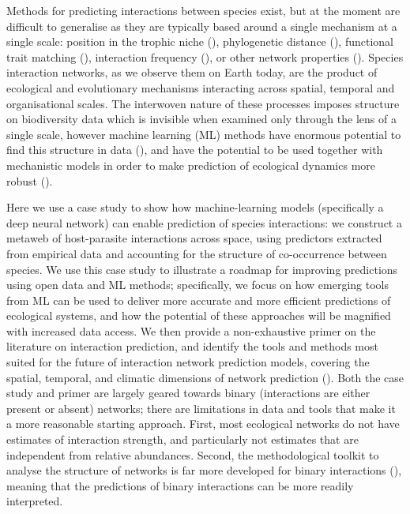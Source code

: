 \begin{refsection}
Methods for predicting interactions between species exist, but at the
moment are difficult to generalise as they are typically based around a
single mechanism at a single scale: position in the trophic niche
(\cite{Gravel2013InfFoo, Petchey2008SizFor}), phylogenetic distance
(\cite{Pomeranz2018InfPre, Elmasri2020HieBay}), functional trait matching
(\cite{Bartomeus2016ComFra}), interaction frequency
(\cite{Weinstein2017ComTra, Vazquez2005IntFre}), or other network
properties (\cite{Terry2020FinMis, Stock2017LinFil}). Species interaction
networks, as we observe them on Earth today, are the product of
ecological and evolutionary mechanisms interacting across spatial,
temporal and organisational scales. The interwoven nature of these
processes imposes structure on biodiversity data which is invisible when
examined only through the lens of a single scale, however machine
learning (ML) methods have enormous potential to find this structure in
data (\cite{Desjardins-Proulx2019ArtInt}), and have the potential to be
used together with mechanistic models in order to make prediction of
ecological dynamics more robust (\cite{Rackauckas2020UniDif}).

Here we use a case study to show how machine-learning models
(specifically a deep neural network) can enable prediction of species
interactions: we construct a metaweb of host-parasite interactions
across space, using predictors extracted from empirical data and
accounting for the structure of co-occurrence between species. We use
this case study to illustrate a roadmap for improving predictions using
open data and ML methods; specifically, we focus on how emerging tools
from ML can be used to deliver more accurate and more efficient
predictions of ecological systems, and how the potential of these
approaches will be magnified with increased data access. We then provide
a non-exhaustive primer on the literature on interaction prediction, and
identify the tools and methods most suited for the future of interaction
network prediction models, covering the spatial, temporal, and climatic
dimensions of network prediction (\cite{Burkle2011FutPla}). Both the case
study and primer are largely geared towards binary (interactions are
either present or absent) networks; there are limitations in data and
tools that make it a more reasonable starting approach. First, most
ecological networks do not have estimates of interaction strength, and
particularly not estimates that are independent from relative
abundances. Second, the methodological toolkit to analyse the structure
of networks is far more developed for binary interactions
(\cite{Delmas2018Analysing}), meaning that the predictions of binary
interactions can be more readily interpreted.


\end{refsection}
